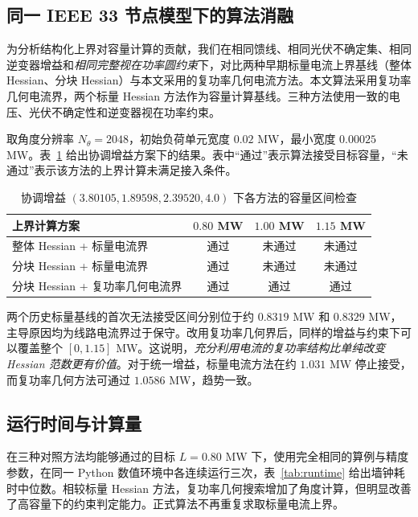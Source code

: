 

\subsection{同一 IEEE 33 节点模型下的算法消融}

为分析结构化上界对容量计算的贡献，我们在相同馈线、相同光伏不确定集、相同逆变器增益和\emph{相同完整视在功率圆约束}下，对比两种早期标量电流上界基线（整体 Hessian、分块 Hessian）与本文采用的复功率几何电流方法。本文算法采用复功率几何电流界，两个标量 Hessian 方法作为容量计算基线。三种方法使用一致的电压、光伏不确定性和逆变器视在功率约束。

取角度分辨率 $N_\theta=2048$，初始负荷单元宽度 $0.02$ MW，最小宽度 $0.00025$ MW。表~\ref{tab:ablation} 给出协调增益方案下的结果。表中“通过”表示算法接受目标容量，“未通过”表示该方法的上界计算未满足接入条件。

\begin{table}[htbp]
\centering
\caption{协调增益 $(3.80105,1.89598,2.39520,4.0)$ 下各方法的容量区间检查}
\label{tab:ablation}
\begin{tabular}{@{}p{65mm}ccc@{}}
\toprule
上界计算方案 & $0.80$ MW & $1.00$ MW & $1.15$ MW\\
\midrule
整体 Hessian + 标量电流界 & 通过 & 未通过 & 未通过\\
分块 Hessian + 标量电流界 & 通过 & 未通过 & 未通过\\
分块 Hessian + 复功率几何电流界 & 通过 & 通过 & 通过\\
\bottomrule
\end{tabular}
\end{table}

两个历史标量基线的首次无法接受区间分别位于约 $0.8319$ MW 和 $0.8329$ MW，主导原因均为线路电流界过于保守。改用复功率几何界后，同样的增益与约束下可以覆盖整个 $[0,1.15]$ MW。这说明，\emph{充分利用电流的复功率结构比单纯改变 Hessian 范数更有价值}。对于统一增益，标量电流方法在约 $1.031$ MW 停止接受，而复功率几何方法可通过 $1.0586$ MW，趋势一致。

\subsection{运行时间与计算量}
在三种对照方法均能够通过的目标 $L=0.80$ MW 下，使用完全相同的算例与精度参数，在同一 Python 数值环境中各连续运行三次，表~\ref{tab:runtime} 给出墙钟耗时中位数。相较标量 Hessian 方法，复功率几何搜索增加了角度计算，但明显改善了高容量下的约束判定能力。正式算法不再重复求取标量电流上界。

